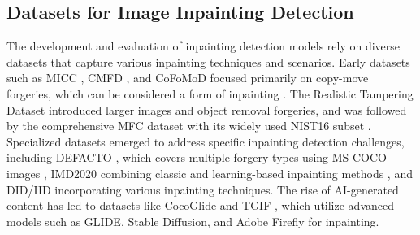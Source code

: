 
\subsection{Datasets for Image Inpainting Detection}

The development and evaluation of inpainting detection models rely on diverse datasets that capture various inpainting techniques and scenarios. Early datasets such as MICC \cite{amerini2011micc}, CMFD \cite{christlein2012cmfd}, and CoFoMoD \cite{tralic2013cofomod} focused primarily on copy-move forgeries, which can be considered a form of inpainting \cite{barglazan2024image}. The Realistic Tampering Dataset \cite{Korus2016TIFS, Korus2016WIFS} introduced larger images and object removal forgeries, and was followed by the comprehensive MFC dataset \cite{guan2019mfc} with its widely used NIST16 subset \cite{kwon2022catnet, wu2023rethinkingimageforgerydetectionfocal, guillaro2023trufor, triaridis2023mmfusion}. Specialized datasets emerged to address specific inpainting detection challenges, including DEFACTO \cite{mahfoudi2019defacto}, which covers multiple forgery types using MS COCO images \cite{lin2014coco, daisy2014asmarterexemplarbased}, IMD2020 \cite{novozamsky2020wacv} combining classic and learning-based inpainting methods \cite{yu2018generativeimageinpaintingcontextual}, and DID/IID \cite{wu2022iid} incorporating various inpainting techniques. The rise of AI-generated content has led to datasets like CocoGlide \cite{guillaro2023trufor} and TGIF \cite{mareen2024tgiftextguidedinpaintingforgery}, which utilize advanced models such as GLIDE, Stable Diffusion, and Adobe Firefly for inpainting. 